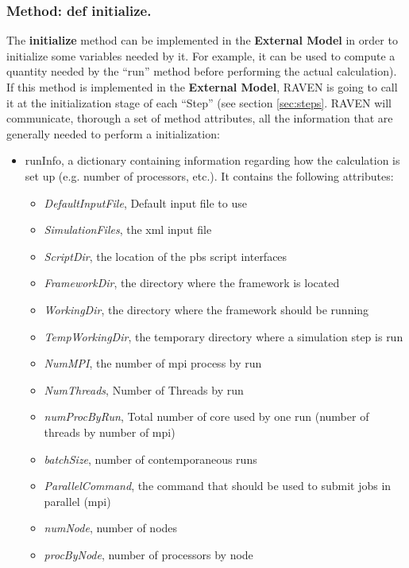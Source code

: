 \subsubsection{Method: def initialize.}
\label{subsubsec:externalInitialize}
The \textbf{initialize} method can be implemented in the  \textbf{External Model} in order to initialize some variables needed by it. For example, it can be used to compute a quantity needed by the ``run'' method before performing the actual calculation).
If this method is implemented in the \textbf{External Model}, RAVEN is going to call it at the initialization stage of each ``Step'' (see section \ref{sec:steps}. RAVEN will communicate, thorough a set of method attributes, all the information that are generally needed to perform a initialization:
\begin{itemize}
\item runInfo, a dictionary containing information regarding how the calculation is set up (e.g. number of processors, etc.). It contains the following attributes:
    \begin{itemize}
       \item \textit{DefaultInputFile},  Default input file to use
       \item \textit{SimulationFiles}, the xml input file
       \item \textit{ScriptDir}, the location of the pbs script interfaces
       \item \textit{FrameworkDir}, the directory where the framework is located
       \item \textit{WorkingDir}, the directory where the framework should be running
       \item \textit{TempWorkingDir}, the temporary directory where a simulation step is run
       \item \textit{NumMPI}, the number of mpi process by run
       \item \textit{NumThreads}, Number of Threads by run
       \item \textit{numProcByRun}, Total number of core used by one run (number of threads by number of mpi)
       \item \textit{batchSize}, number of contemporaneous runs
       \item \textit{ParallelCommand}, the command that should be used to submit jobs in parallel (mpi)
       \item \textit{numNode},  number of nodes
       \item \textit{procByNode},  number of processors by node

\end{itemize}
\end{itemize}
